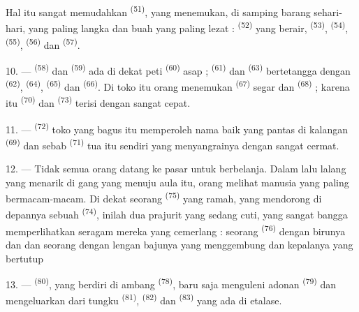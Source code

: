 Hal itu sangat memudahkan 
\textsuperscript{(51)}, yang menemukan, di samping barang sehari-hari,
 yang paling langka dan buah yang paling
lezat :  \textsuperscript{(52)} yang berair,
 \textsuperscript{(53)}, 
\textsuperscript{(54)},  \textsuperscript{(55)},
 \textsuperscript{(56)} dan 
\textsuperscript{(57)}.

\VUsaut{4.0mm}
\VUsaut{3.0mm}

10. ---  \textsuperscript{(58)} dan 
\textsuperscript{(59)} ada di dekat peti 
\textsuperscript{(60)} asap ;  \textsuperscript{(61)}
dan  \textsuperscript{(63)} bertetangga dengan
 \textsuperscript{(62)}, 
\textsuperscript{(64)},  \textsuperscript{(65)} dan
 \textsuperscript{(66)}. Di toko itu orang menemukan
 \textsuperscript{(67)} segar dan 
\textsuperscript{(68)} ; karena itu 
\textsuperscript{(70)} dan 
\textsuperscript{(73)} terisi dengan sangat cepat.

11. ---  \textsuperscript{(72)} toko yang bagus itu
memperoleh nama baik yang pantas di kalangan 
\textsuperscript{(69)} dan  sebab
 \textsuperscript{(71)} tua itu sendiri yang
menyangrainya dengan sangat cermat.

\VUsaut{4.0mm}
\VUsaut{3.0mm}

12. --- Tidak semua orang datang ke pasar untuk berbelanja. Dalam lalu
lalang yang menarik di gang yang menuju aula itu, orang melihat
manusia yang paling bermacam-macam. Di dekat seorang  \textsuperscript{(75)} yang ramah, yang mendorong di
depannya sebuah  \textsuperscript{(74)}, inilah
dua prajurit yang sedang cuti, yang sangat bangga memperlihatkan
seragam mereka yang cemerlang : seorang 
\textsuperscript{(76)} dengan  birunya dan  dan seorang  dengan lengan bajunya
yang menggembung dan kepalanya yang bertutup 

13. ---  \textsuperscript{(80)}, yang berdiri di
ambang  \textsuperscript{(78)}, baru saja
menguleni adonan  \textsuperscript{(79)} dan
mengeluarkan dari tungku 
\textsuperscript{(81)}, 
\textsuperscript{(82)} dan  \textsuperscript{(83)}
yang ada di etalase.

